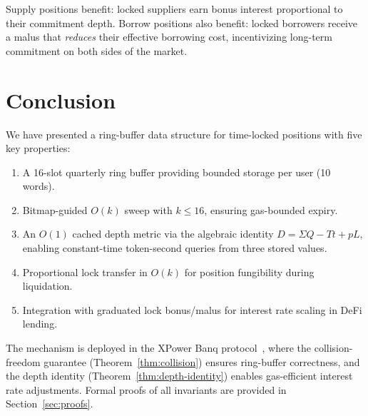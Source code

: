 \documentclass[10pt,a4paper,twocolumn]{article}
\begin{document}
Supply positions benefit: locked suppliers earn bonus interest proportional to their commitment depth. Borrow positions also benefit: locked borrowers receive a malus that \emph{reduces} their effective borrowing cost, incentivizing long-term commitment on both sides of the market.

\section{Conclusion}
\label{sec:conclusion}

We have presented a ring-buffer data structure for time-locked positions with five key properties:

\begin{enumerate}[leftmargin=*, nosep]
\item A 16-slot quarterly ring buffer providing bounded storage per user (10 words).
\item Bitmap-guided $O(k)$ sweep with $k \leq 16$, ensuring gas-bounded expiry.
\item An $O(1)$ cached depth metric via the algebraic identity $D = \Sigma Q - Tt + pL$, enabling constant-time token-second queries from three stored values.
\item Proportional lock transfer in $O(k)$ for position fungibility during liquidation.
\item Integration with graduated lock bonus/malus for interest rate scaling in DeFi lending.
\end{enumerate}

The mechanism is deployed in the XPower Banq protocol~\cite{wp}, where the collision-freedom guarantee (Theorem~\ref{thm:collision}) ensures ring-buffer correctness, and the depth identity (Theorem~\ref{thm:depth-identity}) enables gas-efficient interest rate adjustments. Formal proofs of all invariants are provided in Section~\ref{sec:proofs}.
\end{document}

